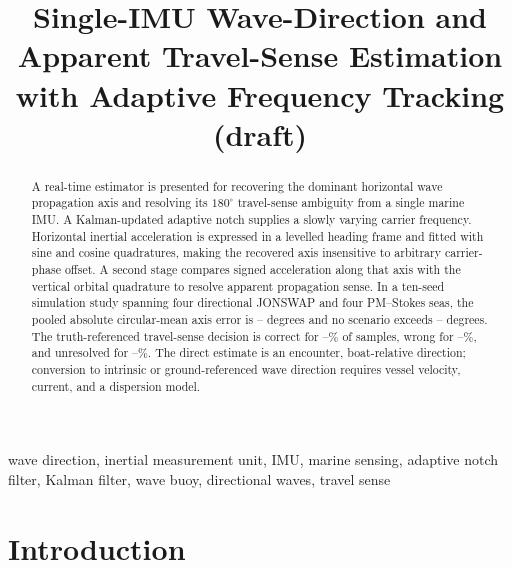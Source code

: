 \documentclass[conference]{IEEEtran}
\title{Single-IMU Wave-Direction and Apparent Travel-Sense Estimation with Adaptive Frequency Tracking (draft)}
\author{%
    \IEEEauthorblockN{Mikhail S. Grushinskiy}
    \IEEEauthorblockA{Independent Researcher, USA, Fair Lawn\\
    Bareboat Necessities GitHub Project\\
    Email: mgrouch@users.github.com}%
}
\begin{document}
\providecommand{\OUValidationDirectionAbsError}{--}
\providecommand{\OUValidationDirectionRMSE}{--}
\providecommand{\OUValidationDirectionWorstAbsError}{--}
\providecommand{\OUValidationDirectionDominant}{--}
\providecommand{\OUValidationDirectionUncertain}{--}
\providecommand{\OUValidationTravelCorrect}{--}
\providecommand{\OUValidationTravelWrong}{--}
\providecommand{\OUValidationTravelUnresolved}{--}
\providecommand{\OUValidationTravelAbsError}{--}

\maketitle

\begin{abstract}
A real-time estimator is presented for recovering the dominant horizontal wave
propagation axis and resolving its $180^\circ$ travel-sense ambiguity from a
single marine IMU.  A Kalman-updated adaptive notch supplies a slowly varying
carrier frequency.  Horizontal inertial acceleration is expressed in a levelled
heading frame and fitted with sine and cosine quadratures, making the recovered
axis insensitive to arbitrary carrier-phase offset.  A second stage compares
signed acceleration along that axis with the vertical orbital quadrature to
resolve apparent propagation sense.  In a ten-seed simulation study spanning
four directional JONSWAP and four PM--Stokes seas, the pooled absolute
circular-mean axis error is \OUValidationDirectionAbsError{} degrees and no
scenario exceeds \OUValidationDirectionWorstAbsError{} degrees.  The
truth-referenced travel-sense decision is correct for
\OUValidationTravelCorrect\% of samples, wrong for
\OUValidationTravelWrong\%, and unresolved for
\OUValidationTravelUnresolved\%.  The direct estimate is an encounter,
boat-relative direction; conversion to intrinsic or ground-referenced wave
direction requires vessel velocity, current, and a dispersion model.
\end{abstract}


\begin{IEEEkeywords}
wave direction, inertial measurement unit, IMU, marine sensing, adaptive notch
filter, Kalman filter, wave buoy, directional waves, travel sense
\end{IEEEkeywords}

\section{Introduction}
\label{sec:wave-direction-intro}
\end{document}
